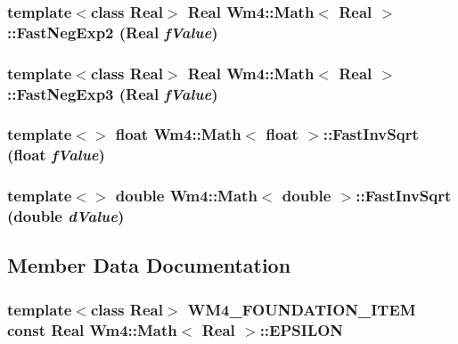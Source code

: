 \subsubsection{\setlength{\rightskip}{0pt plus 5cm}template$<$class Real$>$ Real {\bf Wm4::Math}$<$ Real $>$::Fast\-Neg\-Exp2 (Real {\em f\-Value})\hspace{0.3cm}{\tt  [static]}}\label{classWm4_1_1Math_49a93e80e6fb29e6bdfd2a818e5d10cd}


\subsubsection{\setlength{\rightskip}{0pt plus 5cm}template$<$class Real$>$ Real {\bf Wm4::Math}$<$ Real $>$::Fast\-Neg\-Exp3 (Real {\em f\-Value})\hspace{0.3cm}{\tt  [static]}}\label{classWm4_1_1Math_0ddf42e768ea9d977ea76d37c8b71021}


\subsubsection{\setlength{\rightskip}{0pt plus 5cm}template$<$$>$ float {\bf Wm4::Math}$<$ float $>$::Fast\-Inv\-Sqrt (float {\em f\-Value})}\label{classWm4_1_1Math_87d88d16bb3909384320b2b7b89c25de}


\subsubsection{\setlength{\rightskip}{0pt plus 5cm}template$<$$>$ double {\bf Wm4::Math}$<$ double $>$::Fast\-Inv\-Sqrt (double {\em d\-Value})}\label{classWm4_1_1Math_6ef8a7a052083195e74864c9d3c64268}




\subsection{Member Data Documentation}
\subsubsection{\setlength{\rightskip}{0pt plus 5cm}template$<$class Real$>$ WM4\_\-FOUNDATION\_\-ITEM const Real {\bf Wm4::Math}$<$ Real $>$::{\bf EPSILON}\hspace{0.3cm}{\tt  [static]}}\label{classWm4_1_1Math_862e7780520f49ef23bb9062b0c5ca8f}


